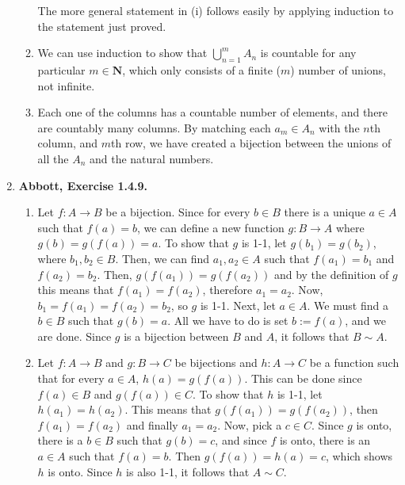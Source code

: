\documentclass{article}
\newcommand{\N}{\mathbf{N}}
\newcommand{\exc}[2][Abbott]{\item \textbf{#1, Exercise #2.}}
\begin{document}
\begin{enumerate}
\begin{enumerate}
		      The more general statement in (i) follows easily by applying induction to the statement just proved.
		      		      		      	      	      	      	        
		\item We can use induction to show that $\bigcup_{n=1}^m A_n$ is countable for any particular $m \in \N$, which only consists of a finite ($m$) number of unions, not infinite.
		      		      		      	      	      	      	        
		\item Each one of the columns has a countable number of elements, and there are countably many columns. By matching each $a_m \in A_n$ with the $n$th column, and $m$th row, we have created a bijection between the unions of all the $A_n$ and the natural numbers.
	\end{enumerate}
				      	          
	\exc{1.4.9}
				      	          
	\begin{enumerate}
		\item Let $f : A \rightarrow B$ be a bijection. Since for every $b \in B$ there is a unique $a \in A$ such that $f(a) = b$, we can define a new function $g: B \rightarrow A$ where $g(b) = g(f(a)) = a$. To show that $g$ is 1-1, let $g(b_1) = g(b_2)$, where $b_1,b_2 \in B$. Then, we can find $a_1, a_2 \in A$ such that $f(a_1) = b_1$ and $f(a_2) = b_2$. Then, $g(f(a_1)) = g(f(a_2))$ and by the definition of $g$ this means that $f(a_1) = f(a_2)$, therefore $a_1 = a_2$. Now, $b_1 = f(a_1) = f(a_2) = b_2$, so $g$ is 1-1. Next, let $a \in A$. We must find a $b \in B$ such that $g(b) = a$. All we have to do is set $b := f(a)$, and we are done. Since $g$ is a bijection between $B$ and $A$, it follows that $B \sim A$.
		      		      		      	      	      	      	              
		\item Let $f : A \rightarrow B$ and $g : B \rightarrow C$ be bijections and $h : A \rightarrow C$ be a function such that for every $a \in A$, $h(a) = g(f(a))$. This can be done since $f(a) \in B$ and $g(f(a)) \in C$. To show that $h$ is 1-1, let $h(a_1) = h(a_2)$. This means that $g(f(a_1)) = g(f(a_2))$, then $f(a_1) = f(a_2)$ and finally $a_1 = a_2$. Now, pick a $c \in C$.  Since $g$ is onto, there is a $b \in B$ such that $g(b) = c$, and since $f$ is onto, there is an $a \in A$ such that $f(a)=b$. Then $g(f(a)) = h(a) = c$, which shows $h$ is onto. Since $h$ is also 1-1, it follows that $A \sim C$.
	\end{enumerate}
				      	          

\end{enumerate}
\end{document}
